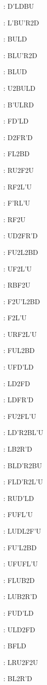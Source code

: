 \documentclass[9pt]{article}
\begin{document}
{\begin{multicols}{6}
: D'LDBU

: L'BU'R2D

: BULD

: BLU'R2D

: BLUD

: U2BULD

: B'ULRD

: FD'LD

: D2FR'D

: FL2BD

: RU2F2U

: RF2L'U

: F'RL'U

: RF2U

: UD2FR'D

: FU2L2BD

: UF2L'U

: RBF2U

: F2U'L2BD

: F2L'U

: URF2L'U

: FUL2BD

: UFD'LD

: LD2FD

: LDFR'D

: FU2FL'U

: LD'R2BL'U

: LB2R'D

: BLD'R2BU

: FLD'R2L'U

: RUD'LD

: FUFL'U

: LUDL2F'U

: FU'L2BD

: UFUFL'U

: FLUB2D

: LUB2R'D

: FUD'LD

: ULD2FD

: BFLD

: LRU2F2U

: BL2R'D


\end{multicols}}
\end{document}
